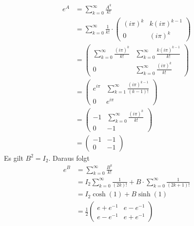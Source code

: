 \documentclass{article}
\begin{document}
    \begin{align*}
        e^A &= \sum_{k = 0}^{\infty} \frac{A^k}{k!}\\
        &= \sum_{k = 0}^{\infty} \frac{1}{k!} \cdot \begin{pmatrix}
            (i\pi)^k & k (i\pi)^{k-1}\\
            0 & (i\pi)^k
        \end{pmatrix}\\
        &= \begin{pmatrix}
            \sum_{k = 0}^{\infty} \frac{(i\pi)^k}{k!} & \sum_{k = 0}^{\infty} \frac{k(i\pi)^{k-1}}{k!}\\
            0 & \sum_{k = 0}^{\infty} \frac{(i\pi)^k}{k!}
        \end{pmatrix}\\
        &= \begin{pmatrix}
            e^{i\pi} & \sum_{k = 1}^{\infty} \frac{(i\pi)^{k-1}}{(k-1)!}\\
            0 & e^{i\pi}
        \end{pmatrix}\\
        &= \begin{pmatrix}
            -1 & \sum_{k = 0}^{\infty} \frac{(i\pi)^k}{k!}\\
            0 & -1
        \end{pmatrix}\\
        &= \begin{pmatrix}
            -1 & -1\\
            0 & -1
        \end{pmatrix}
    \end{align*}
    Es gilt $B^2 = I_2$.
    Daraus folgt
    \begin{align*}
        e^B &= \sum_{k = 0}^{\infty} \frac{B^k}{k!}\\
        &= I_2 \sum_{k = 0}^{\infty} \frac{1}{(2k)!} + B \cdot \sum_{k = 0}^{\infty} \frac{1}{(2k+1)!}\\
        &= I_2 \cosh(1) + B \sinh(1)\\
        &= \frac{1}{2} \begin{pmatrix}
            e + e^{-1} & e - e^{-1}\\
            e - e^{-1} & e + e^{-1}
        \end{pmatrix}
    \end{align*}
\end{document}
